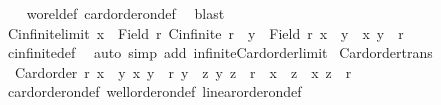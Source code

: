\begin{isabellebody}
%
\isadelimproof
\ \ %
\endisadelimproof
%
\isatagproof
{}\isamarkupfalse%
\ wo{\isacharunderscore}{\kern0pt}rel{\isacharunderscore}{\kern0pt}def\ card{\isacharunderscore}{\kern0pt}order{\isacharunderscore}{\kern0pt}on{\isacharunderscore}{\kern0pt}def\ \isamarkupfalse%
\ blast%
\endisatagproof
{\isafoldproof}%
%
\isadelimproof
\isanewline
%
\endisadelimproof
\isanewline
{}\isamarkupfalse%
\ Cinfinite{\isacharunderscore}{\kern0pt}limit{\isacharcolon}{\kern0pt}\ {\isachardoublequoteopen}{\isasymlbrakk}x\ {\isasymin}\ Field\ r{\isacharsemicolon}{\kern0pt}\ Cinfinite\ r{\isasymrbrakk}\ {\isasymLongrightarrow}\ {\isasymexists}y\ {\isasymin}\ Field\ r{\isachardot}{\kern0pt}\ x\ {\isasymnoteq}\ y\ {\isasymand}\ {\isacharparenleft}{\kern0pt}x{\isacharcomma}{\kern0pt}\ y{\isacharparenright}{\kern0pt}\ {\isasymin}\ r{\isachardoublequoteclose}\isanewline
%
\isadelimproof
\ \ %
\endisadelimproof
%
\isatagproof
{}\isamarkupfalse%
\ cinfinite{\isacharunderscore}{\kern0pt}def\ \isamarkupfalse%
\ {\isacharparenleft}{\kern0pt}auto\ simp\ add{\isacharcolon}{\kern0pt}\ infinite{\isacharunderscore}{\kern0pt}Card{\isacharunderscore}{\kern0pt}order{\isacharunderscore}{\kern0pt}limit{\isacharparenright}{\kern0pt}%
\endisatagproof
{\isafoldproof}%
%
\isadelimproof
\isanewline
%
\endisadelimproof
\isanewline
{}\isamarkupfalse%
\ Card{\isacharunderscore}{\kern0pt}order{\isacharunderscore}{\kern0pt}trans{\isacharcolon}{\kern0pt}\isanewline
\ \ {\isachardoublequoteopen}{\isasymlbrakk}Card{\isacharunderscore}{\kern0pt}order\ r{\isacharsemicolon}{\kern0pt}\ x\ {\isasymnoteq}\ y{\isacharsemicolon}{\kern0pt}\ {\isacharparenleft}{\kern0pt}x{\isacharcomma}{\kern0pt}\ y{\isacharparenright}{\kern0pt}\ {\isasymin}\ r{\isacharsemicolon}{\kern0pt}\ y\ {\isasymnoteq}\ z{\isacharsemicolon}{\kern0pt}\ {\isacharparenleft}{\kern0pt}y{\isacharcomma}{\kern0pt}\ z{\isacharparenright}{\kern0pt}\ {\isasymin}\ r{\isasymrbrakk}\ {\isasymLongrightarrow}\ x\ {\isasymnoteq}\ z\ {\isasymand}\ {\isacharparenleft}{\kern0pt}x{\isacharcomma}{\kern0pt}\ z{\isacharparenright}{\kern0pt}\ {\isasymin}\ r{\isachardoublequoteclose}\isanewline
%
\isadelimproof
\ \ %
\endisadelimproof
%
\isatagproof
{}\isamarkupfalse%
\ card{\isacharunderscore}{\kern0pt}order{\isacharunderscore}{\kern0pt}on{\isacharunderscore}{\kern0pt}def\ well{\isacharunderscore}{\kern0pt}order{\isacharunderscore}{\kern0pt}on{\isacharunderscore}{\kern0pt}def\ linear{\isacharunderscore}{\kern0pt}order{\isacharunderscore}{\kern0pt}on{\isacharunderscore}{\kern0pt}def\isanewline

\end{isabellebody}
